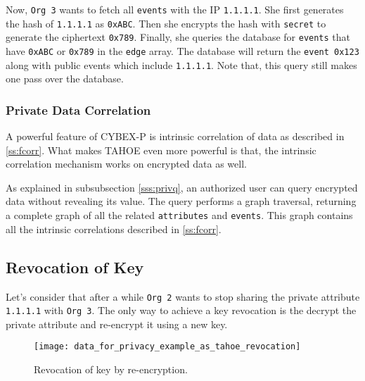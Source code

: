 Now, \texttt{Org 3} wants to fetch all \texttt{events} with the IP \texttt{1.1.1.1}. She first generates the hash of \texttt{1.1.1.1} as \texttt{0xABC}. Then she encrypts the hash with \texttt{secret} to generate the ciphertext \texttt{0x789}. Finally, she queries the database for \texttt{events} that have \texttt{0xABC} or \texttt{0x789} in the \texttt{edge} array. The database will return the \texttt{event 0x123} along with public events which include \texttt{1.1.1.1}. Note that, this query still makes one pass over the database.


\subsubsection*{\textbf{Private Data Correlation}}

A powerful feature of CYBEX-P is intrinsic correlation of data as described in \ref{ss:fcorr}. What makes TAHOE even more powerful is that, the intrinsic correlation mechanism works on encrypted data as well.

As explained in subsubsection \ref{sss:privq}, an authorized user can query encrypted data without revealing its value. The query performs a graph traversal, returning a complete graph of all the related \texttt{attributes} and \texttt{events}. This graph contains all the intrinsic correlations described in \ref{ss:fcorr}.

















\iffalse

\subsection{Revocation of Key}

Let's consider that after a while \texttt{Org 2} wants to stop sharing the private attribute \texttt{1.1.1.1} with \texttt{Org 3}. The only way to achieve a key revocation is the decrypt the private attribute and re-encrypt it using a new key.

\begin{figure}[ht]
	\texttt{[image: data\_for\_privacy\_example\_as\_tahoe\_revocation]}
	\centering
	\caption{Revocation of key by re-encryption.}
	\label{fig:revocation}
\end{figure}

